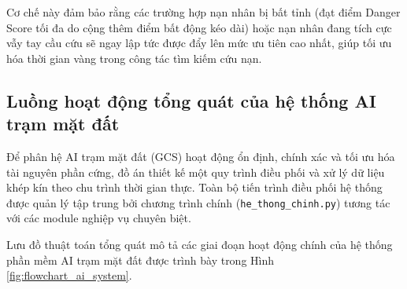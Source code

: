 Cơ chế này đảm bảo rằng các trường hợp nạn nhân bị bất tỉnh (đạt điểm Danger Score tối đa do cộng thêm điểm bất động kéo dài) hoặc nạn nhân đang tích cực vẫy tay cầu cứu sẽ ngay lập tức được đẩy lên mức ưu tiên cao nhất, giúp tối ưu hóa thời gian vàng trong công tác tìm kiếm cứu nạn.

\subsection{Luồng hoạt động tổng quát của hệ thống AI trạm mặt đất}

Để phân hệ AI trạm mặt đất (GCS) hoạt động ổn định, chính xác và tối ưu hóa tài nguyên phần cứng, đồ án thiết kế một quy trình điều phối và xử lý dữ liệu khép kín theo chu trình thời gian thực. Toàn bộ tiến trình điều phối hệ thống được quản lý tập trung bởi chương trình chính (\texttt{he\_thong\_chinh.py}) tương tác với các module nghiệp vụ chuyên biệt.

Lưu đồ thuật toán tổng quát mô tả các giai đoạn hoạt động chính của hệ thống phần mềm AI trạm mặt đất được trình bày trong Hình \ref{fig:flowchart_ai_system}.

